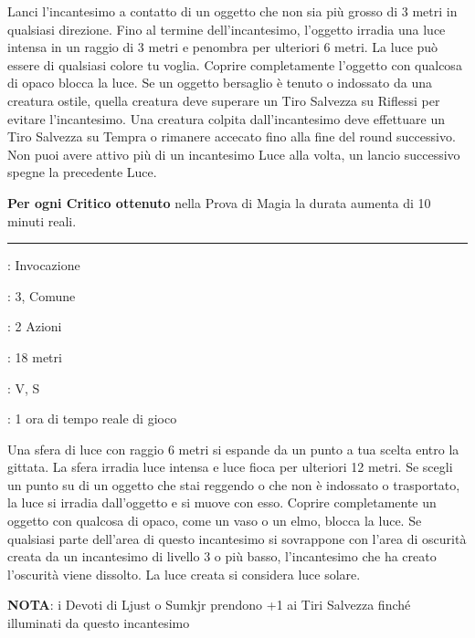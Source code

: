 \begin{multicols}{2}
Lanci l'incantesimo a contatto di un oggetto che non sia più grosso di 3 metri in qualsiasi direzione. Fino al termine dell'incantesimo, l'oggetto irradia una luce intensa in un raggio di 3 metri e penombra per ulteriori 6 metri. La luce può essere di qualsiasi colore tu voglia. Coprire completamente l'oggetto con qualcosa di opaco blocca la luce. Se un oggetto bersaglio è tenuto o indossato da una creatura ostile, quella creatura deve superare un Tiro Salvezza su Riflessi per evitare l'incantesimo. Una creatura colpita dall'incantesimo deve effettuare un Tiro Salvezza su Tempra o rimanere accecato fino alla fine del round successivo. Non puoi avere attivo più di un incantesimo Luce alla volta, un lancio successivo spegne la precedente Luce.

\textbf{Per ogni Critico ottenuto} nella Prova di Magia la durata aumenta di 10 minuti reali.

\smallskip\noindent\rule{\linewidth}{2pt} \hypertarget{Luce Diurna}{}\medskip{}
\noindent
\begin{description}[noitemsep, topsep=0pt, parsep=0pt, partopsep=0pt, leftmargin=0cm, labelwidth=2.8cm]
	\item[\textbf{Lista di Magia}]: Invocazione
	\item[\textbf{Livello}]: 3, Comune
	\item[\textbf{T. di Lancio}]: 2 Azioni
	\item[\textbf{Gittata}]: 18 metri
	\item[\textbf{Componenti}]: V, S
	\item[\textbf{Durata}]: 1 ora di tempo reale di gioco
\end{description}

Una sfera di luce con raggio 6 metri si espande da un punto a tua scelta entro la gittata. La sfera irradia luce intensa e luce fioca per ulteriori 12 metri. Se scegli un punto su di un oggetto che stai reggendo o che non è indossato o trasportato, la luce si irradia dall'oggetto e si muove con esso. Coprire completamente un oggetto con qualcosa di opaco, come un vaso o un elmo, blocca la luce. Se qualsiasi parte dell'area di questo incantesimo si sovrappone con l'area di oscurità creata da un incantesimo di livello 3 o più basso, l'incantesimo che ha creato l'oscurità viene dissolto. La luce creata si considera luce solare.

\textbf{NOTA}: i Devoti di Ljust o Sumkjr prendono +1 ai Tiri Salvezza finché illuminati da questo incantesimo


\end{multicols}

